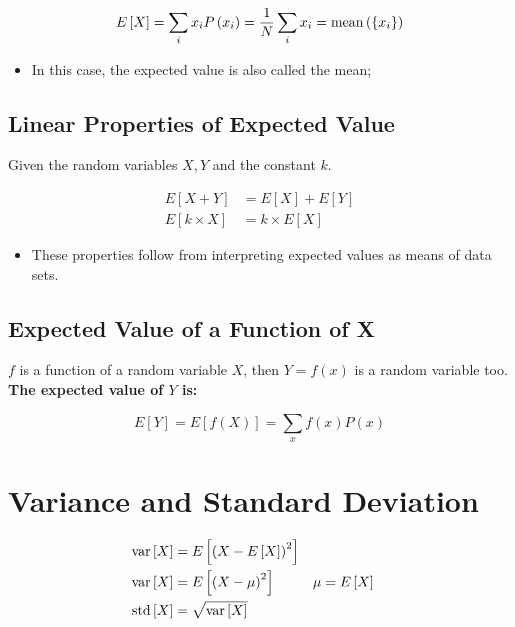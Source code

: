     \begin{equation}\label{eq: ch4-expected-value-as-mean}
      E \left[ X \right] = \sum_{i} x_{i} P\left( x_{i} \right) = \frac{1}{N} \sum_{i} x_{i} = \operatorname{mean} \left( \{ x_{i} \} \right)
    \end{equation}

    \begin{itemize}
      \item In this case, the expected value is also called the mean;
    \end{itemize}

  \subsection{Linear Properties of Expected Value}

    Given the random variables $ X, Y $ and the constant $ k $.

    \begin{align}
      E \left[ X + Y \right] &= E \left[ X \right] + E \left[ Y \right] \\
      E \left[ k \times X \right] &= k \times E \left[ X \right]
    \end{align}

    \begin{itemize}
      \item These properties follow from interpreting expected values as means of data sets.
    \end{itemize}

  \subsection{Expected Value of a Function of X}

    $ f $ is a function of a random variable $ X $, then $ Y = f(x) $ is a random variable too. \textbf{The expected value of $ Y $ is:}

    \begin{equation}
      E \left[ Y \right] = E \left[ f (X) \right] = \sum_{x} f(x) P(x)
    \end{equation}

\section{Variance and Standard Deviation}

  \begin{align}
    \operatorname{var} \left[ X \right] &= E \left[ \left( X - E \left[ X \right] \right)^{2} \right] \\
    \operatorname{var} \left[ X \right] &= E \left[ \left( X - \mu \right)^{2} \right] & \mu &= E \left[ X \right] \\
    \label{eq: ch4-std-is-sqrt-var}
    \operatorname{std} \left[ X \right] &= \sqrt{ \operatorname{var} \left[ X \right] }
  \end{align}

